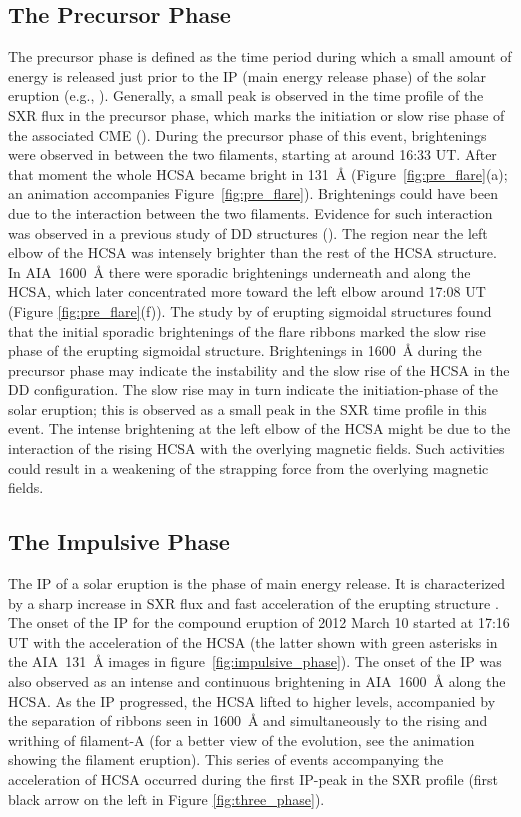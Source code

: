 \documentclass{aastex62}
\begin{document}
\subsection{\textbf{The Precursor Phase}}
The precursor phase is defined as the time period during which a small amount of energy is released just prior to the IP (main energy release phase) of the solar eruption (e.g., \citealt{Zhou_etal_2016}). Generally, a small peak is observed in the time profile of the SXR flux in the precursor phase, which marks the initiation or slow rise phase of the associated CME (\citealt{Zhang_and_Dere_2006}). During the precursor phase of this event, brightenings were observed in between the two filaments, starting at around 16:33 UT. After that moment the whole HCSA became bright in 131~\AA{} (Figure~\ref{fig:pre_flare}(a); an animation accompanies Figure~\ref{fig:pre_flare}). Brightenings could have been due to the interaction between the two filaments. Evidence for such interaction was observed in a previous study of DD structures (\citealt{Liu_etal_2012}). The region near the left elbow of the HCSA was intensely brighter than the rest of the HCSA structure. In AIA~1600~\AA{} there were sporadic brightenings underneath and along the HCSA, which later concentrated more toward the left elbow around 17:08 UT (Figure \ref{fig:pre_flare}(f)). The study by \citet{Cheng_and_Ding_2016} of erupting sigmoidal structures found that the initial sporadic brightenings of the flare ribbons marked the slow rise phase of the erupting sigmoidal structure. Brightenings in 1600~\AA{} during the precursor phase may indicate the instability and the slow rise of the HCSA in the DD configuration. The slow rise may in turn indicate the initiation-phase of the solar eruption; this is observed as a small peak in the SXR time profile in this event. The intense brightening at the left elbow of the HCSA might be due to the interaction of the rising HCSA with the overlying magnetic fields. Such activities could result in a weakening of the strapping force from the overlying magnetic fields.




\subsection{\textbf{The Impulsive Phase}}
The IP of a solar eruption is the phase of main energy release. It is characterized by a sharp increase in SXR flux and fast acceleration of the erupting structure \citep{Zhang_and_Dere_2006}. The onset of the IP for the compound eruption of 2012 March 10 started at 17:16 UT with the acceleration of the HCSA (the latter shown with green asterisks in the AIA~131~\AA{} images in figure~\ref{fig:impulsive_phase}). The onset of the IP was also observed as an intense and continuous brightening in AIA~1600~\AA{} along the HCSA. As the IP progressed, the HCSA lifted to higher levels, accompanied by the separation of ribbons seen in 1600~\AA{} and simultaneously to the rising and writhing of filament-A (for a better view of the evolution, see the animation showing the filament eruption). This series of events accompanying the acceleration of HCSA occurred during the first IP-peak in the SXR profile (first black arrow on the left in Figure \ref{fig:three_phase}).
\end{document}
